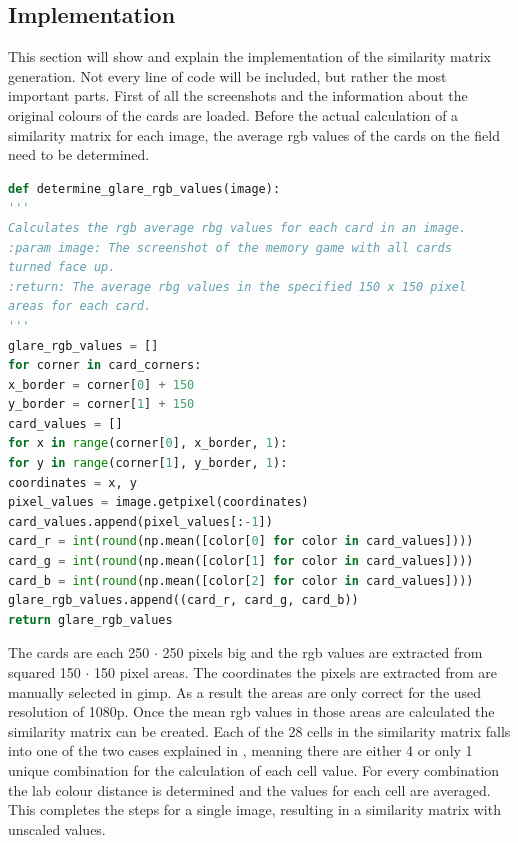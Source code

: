 \subsection{Implementation}
This section will show and explain the implementation of the similarity matrix generation. Not every line of code will be included, but rather the most important parts. First of all the screenshots and the information about the original colours of the cards are loaded. Before the actual calculation of a similarity matrix for each image, the average rgb values of the cards on the field need to be determined. 
\begin{lstlisting}[language=python, caption=Add caption]
def determine_glare_rgb_values(image):
'''
Calculates the rgb average rbg values for each card in an image.
:param image: The screenshot of the memory game with all cards 
turned face up.
:return: The average rbg values in the specified 150 x 150 pixel 
areas for each card. 
'''
glare_rgb_values = []
for corner in card_corners:
x_border = corner[0] + 150
y_border = corner[1] + 150
card_values = []
for x in range(corner[0], x_border, 1):
for y in range(corner[1], y_border, 1):
coordinates = x, y
pixel_values = image.getpixel(coordinates)
card_values.append(pixel_values[:-1])
card_r = int(round(np.mean([color[0] for color in card_values])))
card_g = int(round(np.mean([color[1] for color in card_values])))
card_b = int(round(np.mean([color[2] for color in card_values])))
glare_rgb_values.append((card_r, card_g, card_b))
return glare_rgb_values 
\end{lstlisting}
The cards are each 250 $\cdot$ 250 pixels big and the rgb values are extracted from squared 150 $\cdot$ 150 pixel areas. The coordinates the pixels are extracted from are manually selected in gimp. As a result the areas are only correct for the used resolution of 1080p. Once the mean rgb values in those areas are calculated the similarity matrix can be created. Each of the 28 cells in the similarity matrix falls into one of the two cases explained in , meaning there are either 4 or only 1 unique combination for the calculation of each cell value. For every combination the lab colour distance is determined and the values for each cell are averaged. This completes the steps for a single image, resulting in a similarity matrix with unscaled values. 
